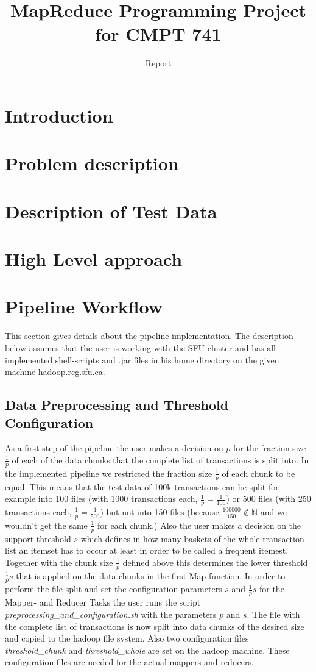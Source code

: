 \documentclass[a4paper,ngerman]{scrartcl}
\begin{document}
\title{MapReduce Programming Project for CMPT 741}
\subtitle{Report}
\maketitle

\section{Introduction}
\section{Problem description}
\section{Description of Test Data}
\section{High Level approach}
\section{Pipeline Workflow}
This section gives details about the pipeline implementation. The description below assumes that the user is working with the SFU cluster and has all implemented shell-scripts and .jar files in his home directory on the given machine hadoop.rcg.sfu.ca.
\subsection{Data Preprocessing and Threshold Configuration}
As a first step of the pipeline the user makes a decision on $p$ for the fraction size $\frac{1}{p}$ of each of the data chunks that the complete list of transactions is split into. In the implemented pipeline we restricted the fraction size $\frac{1}{p}$ of each chunk to be equal. This means that the test data of 100k transactions can be split for example into 100 files (with 1000 transactions each, $\frac{1}{p}=\frac{1}{100}$) or 500 files (with 250 transactions each, $\frac{1}{p}=\frac{1}{500}$) but not into 150 files (because $\frac{100000}{150} \notin \mathbb{N}$ and we wouldn't get the same $\frac{1}{p}$ for each chunk.) 
Also the user makes a decision on the support threshold $s$ which defines in how many baskets of the whole transaction list an itemset has to occur at least in order to be called a frequent itemest. Together with the chunk size $\frac{1}{p}$ defined above this determines the lower threshold $\frac{1}{p}s$ that is applied on the data chunks in the first Map-function. In order to perform the file split and set the configuration parameters $s$ and $\frac{1}{p}s$ for the Mapper- and Reducer Tasks the user runs the script \textit{preprocessing\_and\_configuration.sh} with the parameters $p$ and $s$. The file with the complete list of transactions is now split into data chunks of the desired size and copied to the hadoop file system. Also two configuration files \textit{threshold\_chunk} and \textit{threshold\_whole} are set on the hadoop machine. These configuration files are needed for the actual mappers and reducers.
\end{document}
